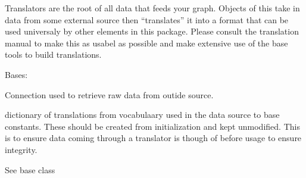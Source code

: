 \documentclass[letterpaper,10pt,english]{sphinxmanual}
\begin{document}
Translators are the root of all data that feeds your graph. Objects of this
take in data from some external source then “translates” it into a format that
can be used universaly by other elements in this package. Please consult the
translation manual to make this as usabel as possible and make extensive use
of the base tools to build translations.

\begin{fulllineitems}
\label{\detokenize{dalio.translator:dalio.translator.translator.Translator}}
Bases: 

\begin{fulllineitems}
\label{\detokenize{dalio.translator:dalio.translator.translator.Translator._source}}
Connection used to retrieve raw data from outide source.

\end{fulllineitems}


\begin{fulllineitems}
\label{\detokenize{dalio.translator:dalio.translator.translator.Translator.translations}}
dictionary of translations from vocabulaary used in the
data source to base constants. These should be created from
initialization and kept unmodified. This is to ensure data coming
through a translator is though of before usage to ensure
integrity.

\end{fulllineitems}


\begin{fulllineitems}
\label{\detokenize{dalio.translator:dalio.translator.translator.Translator.set_input}}
See base class


\end{fulllineitems}
\end{fulllineitems}
\end{document}

